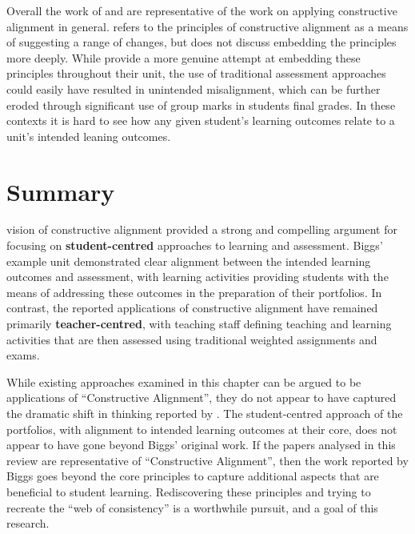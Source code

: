 Overall the work of \citet{Gaspar:2012} and \citet{Thota:2010} are representative of the work on applying constructive alignment in general. \citet{Gaspar:2012} refers to the principles of constructive alignment \cite{Biggs:1996c} as a means of suggesting a range of changes, but does not discuss embedding the principles more deeply. While \citet{Thota:2010} provide a more genuine attempt at embedding these principles throughout their unit, the use of traditional assessment approaches could easily have resulted in unintended misalignment, which can be further eroded through significant use of group marks in students final grades. In these contexts it is hard to see how any given student's learning outcomes relate to a unit's intended leaning outcomes.


\clearpage
\section{Summary} %
\label{sec:closing_comments}

\citet{Biggs:1996c} vision of constructive alignment provided a strong and compelling argument for focusing on \textbf{student-centred} approaches to learning and assessment. Biggs' example unit demonstrated clear alignment between the intended learning outcomes and assessment, with learning activities providing students with the means of addressing these outcomes in the preparation of their portfolios. In contrast, the reported applications of constructive alignment have remained primarily \textbf{teacher-centred}, with teaching staff defining teaching and learning activities that are then assessed using traditional weighted assignments and exams.

While existing approaches examined in this chapter can be argued to be applications of ``Constructive Alignment'', they do not appear to have captured the dramatic shift in thinking reported by \citet{Biggs:1996c}. The student-centred approach of the portfolios, with alignment to intended learning outcomes at their core, does not appear to have gone beyond Biggs' original work. If the papers analysed in this review are representative of ``Constructive Alignment'', then the work reported by Biggs goes beyond the core principles to capture additional aspects that are beneficial to student learning. Rediscovering these principles and trying to recreate the ``web of consistency'' is a worthwhile pursuit, and a goal of this research.


